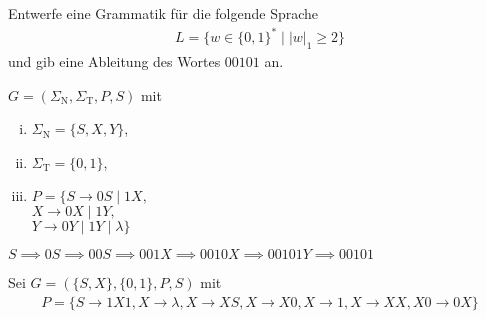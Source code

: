 \documentclass[a4paper,ngerman,12pt]{exam}
\newcommand\ST{\Sigma_{\mathrm{T}}}
\newcommand\SN{\Sigma_{\mathrm{N}}}
\begin{document}
\begin{questions}
\question Entwerfe eine Grammatik für die folgende Sprache
  \begin{align*}
    L = \{w \in \{0,1\}^* \mid |w|_1 \geq 2\}
  \end{align*}
  und gib eine Ableitung des Wortes $00101$ an.
\begin{solutionorbox}[8em]
  $G = (\SN, \ST, P, S)$ mit
  \begin{enumerate}[(i)]
    \item $\SN = \{S, X, Y\}$,
    \item $\ST = \{0,1\}$,
    \item $P = \{S \to 0S \mid 1X,$ \\
      \hspace*{2.4em}$X \to 0X \mid 1Y,$ \\
      \hspace*{2.4em}$Y \to 0Y \mid 1Y \mid \lambda\}$
  \end{enumerate}

  $S \implies 0S \implies 00S \implies 001X \implies 0010X \implies 00101Y
  \implies 00101$
\end{solutionorbox}

\question Sei
  $G = (\{S,X\}, \{0,1\}, P, S)$ mit
  \begin{align*}
    P = \{S \to 1X1, X \to \lambda, X \to XS, X \to X0, X \to 1, X \to XX, X0 \to 0X\}
  \end{align*}


\end{questions}
\end{document}
